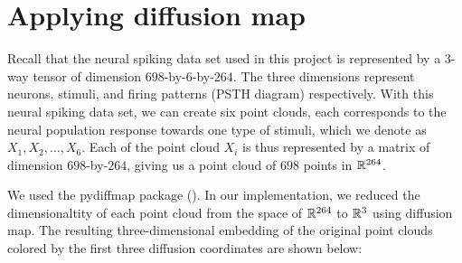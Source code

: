\section{Applying diffusion map}
Recall that the neural spiking data set used in this project is represented by a $3$-way tensor of dimension $698$-by-$6$-by-$264$. The three dimensions represent neurons, stimuli, and firing patterns (PSTH diagram) respectively. With this neural spiking data set, we can create six point clouds, each corresponds to the neural population response towards one type of stimuli, which we denote as $X_1, X_2, \dots,X_6$. Each of the point cloud $X_i$ is thus represented by a matrix of dimension $698$-by-$264$, giving us a point cloud of $698$ points in $\mathbb R^{264}$. 

We used the pydiffmap package (\cite{eastman_pydiffmap_2017}). In our implementation, we reduced the dimensionaltity of each point cloud from the space of $\mathbb R^{264}$ to $\mathbb R^3$ using diffusion map. The resulting three-dimensional embedding of the original point clouds colored by the first three diffusion coordinates are shown below:
